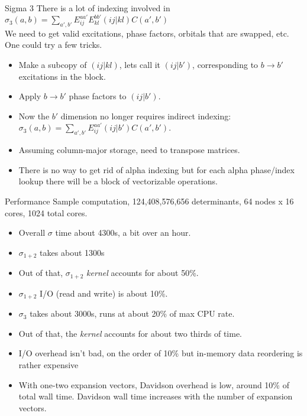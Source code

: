 \documentclass{beamer}
\begin{document}
\begin{frame}[fragile]{Sigma 3}
  There is a lot of indexing involved in 
  $\sigma_3(a,b) = \sum_{a',b'} E_{ij}^{aa'} E_{kl}^{bb'} (ij|kl) C(a',b')$ \\
  We need to get valid excitations, phase factors, orbitals that are swapped, etc.
  One could try a few tricks.
\begin{itemize}
\item Make a subcopy of $(ij|kl)$, lets call it $(ij|b')$, corresponding to
  $b \rightarrow b'$ excitations in the block.
\item Apply $b \rightarrow b'$ phase factors to $(ij|b')$.
\item Now the $b'$ dimension no longer requires indirect indexing: \\
  $\sigma_3(a,b) = \sum_{a',b'} E_{ij}^{aa'} (ij|b') C(a',b')$.
\item Assuming column-major storage, need to transpose matrices.
\item There is no way to get rid of alpha indexing but
  for each alpha phase/index lookup there will be a block of vectorizable operations.
\end{itemize}
\end{frame}


\begin{frame}[fragile]{Performance}
Sample computation, 124,408,576,656 determinants, 64 nodes x 16 cores, 1024 total cores.
\begin{itemize}
\item Overall $\sigma$ time about 4300s, a bit over an hour.
\item $\sigma_{1+2}$ takes about 1300s
\item Out of that, $\sigma_{1+2}$ {\em kernel} accounts for about 50\%.
\item $\sigma_{1+2}$ I/O (read and write) is about 10\%.
\item $\sigma_{3}$ takes about 3000s, runs at about 20\% of max CPU rate.
\item Out of that, the {\em kernel} accounts for about two thirds of time.
\item I/O overhead isn't bad, on the order of 10\% but in-memory data reordering is rather expensive
\item With one-two expansion vectors, Davidson overhead is low, around 10\% of total wall time.
  Davidson wall time increases with the number of expansion vectors.
\end{itemize}
\end{frame}
\end{document}
